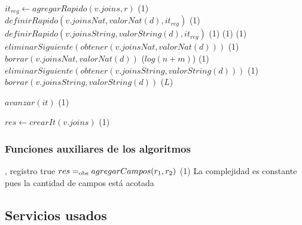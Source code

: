 {                \State
                \State $it_{reg} \gets agregarRapido(v.joins, r)$   \comment \bigo(1)
                    \State $definirRapido(v.joinsNat, valorNat(d), it_{reg})$           \comment \bigo(1)
                \Else
                    \State $definirRapido(v.joinsString, valorString(d), it_{reg})$     \comment \bigo(1)
                \EndIf
            \EndIf
        \Else
                                                       \comment \bigo(1)
                           \comment \bigo(1)
                    \State $eliminarSiguiente(obtener(v.joinsNat, valorNat(d)))$        \comment \bigo(1)
                    \State $borrar(v.joinsNat, valorNat(d))$        \comment \bigo($log(n+m)$)
                \EndIf
            \Else
                     \comment \bigo(1)
                    \State $eliminarSiguiente(obtener(v.joinsString, valorString(d)))$  \comment \bigo(1)
                    \State $borrar(v.joinsString, valorString(d))$  \comment \bigo($L$)
                \EndIf
            \EndIf
        \EndIf

        \State $avanzar(it)$                                        \comment \bigo(1)
    \EndWhile

    \State
    \State $res \gets crearIt(v.joins)$                             \comment \bigo(1)
}

\subsubsection{Funciones auxiliares de los algoritmos}

{   ,
    }
{registro}
{true}
{$res =_{\mathrm{obs}} agregarCampos(r_1, r_2)$}
{\bigo(1)}
{}
{La complejidad es constante pues la cantidad de campos está acotada}


\subsection{Servicios usados}

